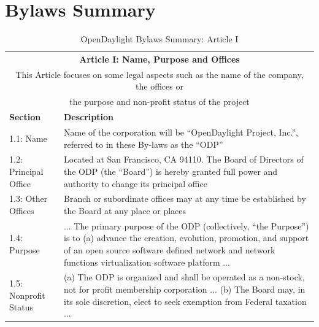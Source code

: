 \documentclass[a4paper, 12pt]{book}
\begin{document}
\chapter{Bylaws Summary}
\label{chap:appendix_bylaws}
\begin{table}[H]
  \begin{center}
    \begin{tabular}{ | p{4cm} | p{11cm} | }
    \toprule
    \multicolumn {2}{|c|}{\textbf{Article I: Name, Purpose and Offices}} \\
    \multicolumn {2}{|c|}{This Article focuses on some legal aspects such as the name of the company, the offices or} \\
    \multicolumn {2}{|c|}{the purpose and non-profit status of the project} \\
    \hline
    \textbf{Section} & \textbf{Description} \\
    \hline
    1.1: Name & Name of the corporation will be “OpenDaylight Project, Inc.”, referred to in these By-laws as the “ODP” \\
    \hline
    1.2: Principal Office & Located at San Francisco, CA 94110.  The Board of Directors of the ODP (the “Board”) is hereby granted full power and authority to change its principal office \\
    \hline
    1.3: Other Offices & Branch or subordinate offices may at any time be established by the Board at any place or places \\
    \hline
    1.4: Purpose & ... The primary purpose of the ODP (collectively, “the Purpose”) is to (a) advance the creation, evolution, promotion, and support of an open source software defined network and network functions virtualization software platform ... \\
    \hline
    1.5: Nonprofit Status & (a) The ODP is organized and shall be operated as a non-stock, not for profit membership corporation ... (b) The Board may, in its sole discretion, elect to seek exemption from Federal taxation ...\\
    \bottomrule
    \end{tabular}
    \caption{OpenDaylight Bylaws Summary: Article I}
    \label{tab:odlbylaws-art01}
  \end{center}
\end{table}
\end{document}
